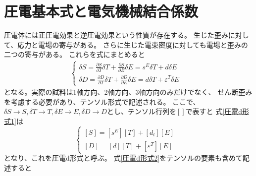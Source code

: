 \documentclass[dvipdfmx,12pt,a4paper]{jreport}
\begin{document}
		\section{圧電基本式と電気機械結合係数}
		圧電体には正圧電効果と逆圧電効果という性質が存在する。
		生じた歪みに対して、応力と電場の寄与がある。
		さらに生じた電束密度に対しても電場と歪みの二つの寄与がある。
		これらを式にまとめると
				\begin{eqnarray}
					\begin{cases}
						\delta S=\frac{\partial S}{\partial T}\delta T + \frac{\partial S}{\partial E} \delta E 
						= s^{E}\delta T+d \delta E & \\
						\delta D=\frac{\partial D}{\partial T}\delta T + \frac{\partial D}{\partial E}\delta E 
						= d \delta T+\varepsilon^T \delta E  &
					\end{cases}
					\label{圧電d形式1}
				\end{eqnarray}
			となる。実際の試料は1軸方向、2軸方向、3軸方向のみだけでなく、
			せん断歪みを考慮する必要があり、テンソル形式で記述される。
			ここで、$\delta S\rightarrow S, \delta T\rightarrow T,
			\delta E\rightarrow E, \delta D\rightarrow D$とし、テンソル行列を$\left[　\right]$で表すと
			式\ref{圧電d形式1}は
			\begin{equation}
				\begin{cases}
					\left[S\right]=\left[s^E\right]\left[T\right]+\left[d_t\right]\left[E\right]& \\
					\left[D\right]=\left[d\right]\left[T\right]+\left[\varepsilon^T\right]\left[E\right]
				\end{cases}
				\label{圧電d形式2}
			\end{equation}
			となり、これを圧電d形式と呼ぶ。
			式\ref{圧電d形式2}をテンソルの要素も含めて記述すると
\end{document}
